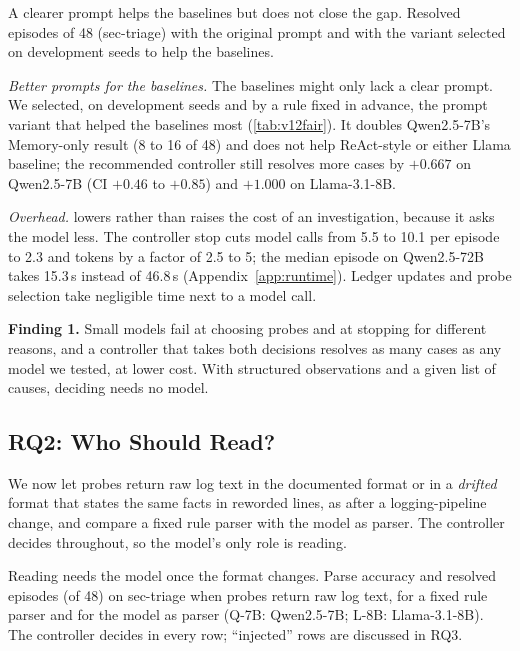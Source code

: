 \begin{table}[t]
  \caption{A clearer prompt helps the baselines but does not close the gap. Resolved episodes of 48 (sec-triage) with the original prompt and with the variant selected on development seeds to help the baselines.}
  \label{tab:v12fair}
  \centering\small
  \begin{adjustbox}{max width=\columnwidth}\end{adjustbox}
\end{table}

\emph{Better prompts for the baselines.} The baselines might only lack a clear prompt. We selected, on development seeds and by a rule fixed in advance, the prompt variant that helped the baselines most (\cref{tab:v12fair}). It doubles Qwen2.5-7B's Memory-only result (8 to 16 of 48) and does not help ReAct-style or either Llama baseline; the recommended controller still resolves more cases by $+0.667$ on Qwen2.5-7B (CI $+0.46$ to $+0.85$) and $+1.000$ on Llama-3.1-8B.

\emph{Overhead.} \hesp{} lowers rather than raises the cost of an investigation, because it asks the model less. The controller stop cuts model calls from 5.5 to 10.1 per episode to 2.3 and tokens by a factor of 2.5 to 5; the median episode on Qwen2.5-72B takes 15.3\,s instead of 46.8\,s (Appendix~\ref{app:runtime}). Ledger updates and probe selection take negligible time next to a model call.

\smallskip\noindent\textbf{Finding 1.} Small models fail at choosing probes and at stopping for different reasons, and a controller that takes both decisions resolves as many cases as any model we tested, at lower cost. With structured observations and a given list of causes, deciding needs no model.


\subsection{RQ2: Who Should Read?}
\label{sec:read}
We now let probes return raw log text in the documented format or in a \emph{drifted} format that states the same facts in reworded lines, as after a logging-pipeline change, and compare a fixed rule parser with the model as parser. The controller decides throughout, so the model's only role is reading.

\begin{table}[t]
  \caption{Reading needs the model once the format changes. Parse accuracy and resolved episodes (of 48) on sec-triage when probes return raw log text, for a fixed rule parser and for the model as parser (Q-7B: Qwen2.5-7B; L-8B: Llama-3.1-8B). The controller decides in every row; ``injected'' rows are discussed in RQ3.}
  \label{tab:v12raw}
  \centering\small
  \begin{adjustbox}{max width=\columnwidth}\end{adjustbox}
\end{table}

